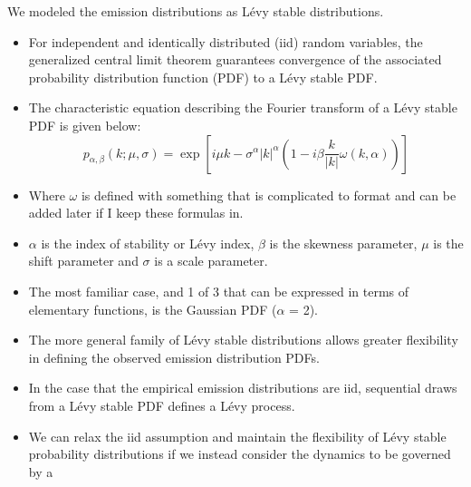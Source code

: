 \documentclass{article}
\begin{document}
  \noindent We modeled the emission distributions as L\'evy stable distributions.  %
  \begin{itemize}
    \item For independent and identically distributed (iid) random variables, the 
    generalized central limit theorem guarantees convergence of the associated 
    probability distribution function (PDF) to a L\'evy stable PDF. \cite{klages_anomalous_2008}
    \item The characteristic equation describing the Fourier transform of a L\'evy 
    stable PDF is given below:
    \begin{equation}
    p_{\alpha, \beta}(k;\mu,\sigma) =\exp\left[i\mu k - \sigma^{\alpha}|k|^{\alpha}\left(1 - i\beta\frac{k}{|k|}\omega(k, \alpha)\right)\right]
    \end{equation}
    \item Where $\omega$ is defined with something that is complicated to format and can be 
    added later if I keep these formulas in. %
    \item $\alpha$ is the index of stability or L\'evy index, $\beta$ is the skewness 
    parameter, $\mu$ is the shift parameter and $\sigma$ is a scale parameter.
    \item The most familiar case, and 1 of 3 that can be expressed in terms of elementary
    functions, is the Gaussian PDF ($\alpha$ = 2).
    \item The more general family of L\'evy stable distributions allows
    greater flexibility in defining the observed emission distribution PDFs.
    \item In the case that the empirical emission distributions are iid, sequential draws
    from a L\'evy stable PDF defines a L\'evy process. 
    \item We can relax the iid assumption and maintain the flexibility of L\'evy stable 
    probability distributions if we instead consider the dynamics to be governed by a

\end{itemize}
\end{document}
